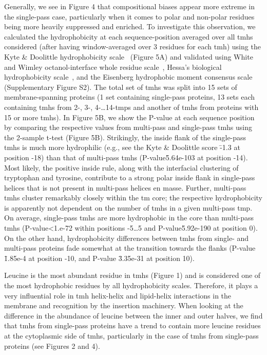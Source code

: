 Generally, we see in Figure 4 that compositional biases appear more extreme in the single-pass case, particularly when it comes to polar and non-polar residues being more heavily suppressed and enriched. To investigate this observation, we calculated the hydrophobicity at each sequence-position averaged over all \gls{tmh}s considered (after having window-averaged over 3 residues for each \gls{tmh}) using the Kyte \& Doolittle hydrophobicity scale~\cite{Kyte1982} (Figure 5A) and validated using White and Wimley octanol-interface whole residue scale~\cite{White1999}, Hessa’s biological hydrophobicity scale~\cite{Hessa2005}, and the Eisenberg hydrophobic moment consensus scale~\cite{Eisenberg1984} (Supplementary Figure S2). The total set of \gls{tmh}s was split into 15 sets of membrane-spanning proteins (1 set containing single-pass proteins, 13 sets each containing \gls{tmh}s from 2-, 3-, 4-\ldots 14-\gls{tmp}s and another of \gls{tmh}s from proteins with 15 or more \gls{tmh}s). In Figure 5B, we show the P-value at each sequence position by comparing the respective values from multi-pass and single-pass \gls{tmh}s using the 2-sample t-test (Figure 5B). Strikingly, the inside flank of the single-pass \gls{tmh}s is much more hydrophilic (e.g., see the Kyte \& Doolittle score \= -1.3 at position -18) than that of multi-pass \gls{tmh}s (P-value\=5.64e-103 at position -14). Most likely, the positive inside rule, along with the interfacial clustering of tryptophan and tyrosine, contribute to a strong polar inside flank in single-pass helices that is not present in multi-pass helices en masse. Further, multi-pass \gls{tmh}s cluster remarkably closely within the \gls{tm} core; the respective hydrophobicity is apparently not dependent on the number of \gls{tmh}s in a given multi-pass \gls{tmp}. On average, single-pass \gls{tmh}s are more hydrophobic in the core than multi-pass \gls{tmh}s (P-value<1.e-72 within positions -5…5 and P-value\=5.92e-190 at position 0). On the other hand, hydrophobicity differences between \gls{tmh}s from single- and multi-pass proteins fade somewhat at the transition towards the flanks (P-value \= 1.85e-4 at position -10, and P-value \= 3.35e-31 at position 10).

Leucine is the most abundant residue in \gls{tmh}s (Figure 1) and is considered one of the most hydrophobic residues by all hydrophobicity scales. Therefore, it plays a very influential role in \gls{tmh} helix-helix and lipid-helix interactions in the membrane and recognition by the insertion machinery. When looking at the difference in the abundance of leucine between the inner and outer halves, we find that \gls{tmh}s from single-pass proteins have a trend to contain more leucine residues at the cytoplasmic side of \gls{tmh}s, particularly in the case of \gls{tmh}s from single-pass proteins (see Figures 2 and 4).

